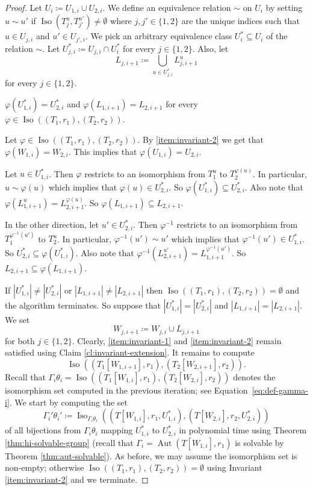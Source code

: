 \documentclass{theoretics}
\DeclareMathOperator{\Aut}{Aut}
\DeclareMathOperator{\Iso}{Iso}
\begin{document}
\begin{proof}
 Let $U_{i} \coloneqq U_{1,i} \cup U_{2,i}$.
 We define an equivalence relation $\sim$ on $U_i$ by setting $u \sim u'$ if $\Iso(T_j^u,T_{j'}^{u'}) \neq \emptyset$ where $j,j' \in \{1,2\}$ are the unique indices such that $u \in U_{j,i}$ and $u' \in U_{j',i}$.
 We pick an arbitrary equivalence class $U_i^* \subseteq U_i$ of the relation $\sim$.
 Let $U_{j,i}^* \coloneqq U_{j,i} \cap U_i^*$ for every $j \in \{1,2\}$.
 Also, let
 \[L_{j,i+1} \coloneqq \bigcup_{u \in U_{j,i}^*} L_{j,i+1}^u\]
 for every $j \in \{1,2\}$.

 \begin{claim}
  \label{cl:invariant-extension}
  $\varphi(U_{1,i}^*) = U_{2,i}^*$ and $\varphi(L_{1,i+1}) = L_{2,i+1}$ for every $\varphi \in \Iso((T_1,r_1),(T_2,r_2))$.
 \end{claim}

 \begin{subproof}
  Let $\varphi \in \Iso((T_1,r_1),(T_2,r_2))$.
  By \ref{item:invariant-2} we get that $\varphi(W_{1,i}) = W_{2,i}$.
  This implies that $\varphi(U_{1,i}) = U_{2,i}$.

  Let $u \in U_{1,i}^*$.
  Then $\varphi$ restricts to an isomorphism from $T_1^u$ to $T_2^{\varphi(u)}$.
  In particular, $u \sim \varphi(u)$ which implies that $\varphi(u) \in U_{2,i}^*$.
  So $\varphi(U_{1,i}^*) \subseteq U_{2,i}^*$.
  Also note that $\varphi(L_{1,i+1}^u) = L_{2,i+1}^{\varphi(u)}$.
  So $\varphi(L_{1,i+1}) \subseteq L_{2,i+1}$.

  In the other direction, let $u' \in U_{2,i}^*$.
  Then $\varphi^{-1}$ restricts to an isomorphism from $T_1^{\varphi^{-1}(u')}$ to $T_2^{u}$.
  In particular, $\varphi^{-1}(u') \sim u'$ which implies that $\varphi^{-1}(u') \in U_{1,i}^*$.
  So $U_{2,i}^* \subseteq \varphi(U_{1,i}^*)$.
  Also note that $\varphi^{-1}(L_{2,i+1}^{u'}) = L_{1,i+1}^{\varphi^{-1}(u')}$.
  So $L_{2,i+1} \subseteq \varphi(L_{1,i+1})$.
 \end{subproof}

 If $|U_{1,i}^*| \neq |U_{2,i}^*|$ or $|L_{1,i+1}| \neq |L_{2,i+1}|$ then $\Iso((T_1,r_1),(T_2,r_2)) = \emptyset$ and the algorithm terminates.
 So suppose that $|U_{1,i}^*| = |U_{2,i}^*|$ and $|L_{1,i+1}| = |L_{2,i+1}|$.
 We set
 \[W_{j,i+1} \coloneqq W_{j,i} \cup L_{j,i+1}\]
 for both $j \in \{1,2\}$.
 Clearly, \ref{item:invariant-1} and \ref{item:invariant-2} remain satisfied using Claim \ref{cl:invariant-extension}.
 It remains to compute
 \[\Iso((T_1[W_{1,i+1}],r_1),(T_2[W_{2,i+1}],r_2)).\]
 Recall that $\Gamma_i\theta_i = \Iso((T_1[W_{1,i}],r_1),(T_2[W_{2,i}],r_2))$ denotes the isomorphism set computed in the previous iteration; see Equation~\eqref{eq:def-gamma-i}.
 We start by computing the set
 \[\Gamma_i'\theta_i' \coloneqq \Iso_{\Gamma_i\theta_i}((T[W_{1,i}],r_1,U_{1,i}^*),(T[W_{2,i}],r_2,U_{2,i}^*))
 \]
 of all bijections from $\Gamma_i\theta_i$ mapping $U_{1,i}^*$ to $U_{2,i}^*$ in polynomial time using Theorem \ref{thm:hi-solvable-group}
 (recall that $\Gamma_i = \Aut(T[W_{1,i}],r_1)$ is solvable by Theorem \ref{thm:aut-solvable}).
 As before, we may assume the isomorphism set is non-empty; otherwise $\Iso((T_1,r_1),(T_2,r_2)) = \emptyset$ using Invariant \ref{item:invariant-2} and we terminate.


\end{proof}
\end{document}
